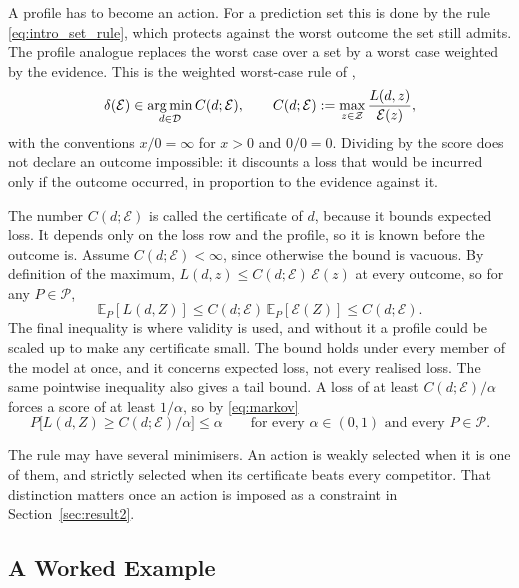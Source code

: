 A profile has to become an action. For a prediction set this is done by the
rule \eqref{eq:intro_set_rule}, which protects against the worst outcome the
set still admits. The profile analogue replaces the worst case over a set by a
worst case weighted by the evidence. This is the weighted worst-case rule of
\citet{KoningvanMeer2025},
\begin{equation}
  \delta(\mathcal E)\in\operatorname*{arg\,min}_{d\in\mathcal D}C(d;\mathcal E),
  \qquad
  C(d;\mathcal E):=\max_{z\in\mathcal Z}
  \frac{L(d,z)}{\mathcal E(z)},
  \label{eq:wl_decision}
\end{equation}
with the conventions $x/0=\infty$ for $x>0$ and $0/0=0$. Dividing by the score
does not declare an outcome impossible: it discounts a loss that would be
incurred only if the outcome occurred, in proportion to the evidence against
it.

The number $C(d;\mathcal E)$ is called the certificate of $d$, because it
bounds expected loss. It depends only on the loss row and the profile, so it
is known before the outcome is. Assume $C(d;\mathcal E)<\infty$, since otherwise the
bound is vacuous. By definition of the maximum,
$L(d,z)\leq C(d;\mathcal E)\,\mathcal E(z)$ at every outcome, so for any
$P\in\mathcal P$,
\begin{equation}
  \mathbb E_{P}[L(d,Z)]
  \leq C(d;\mathcal E)\,\mathbb E_{P}[\mathcal E(Z)]
  \leq C(d;\mathcal E).
  \label{eq:cert_bound}
\end{equation}
The final inequality is where validity is used, and without it a profile could
be scaled up to make any certificate small. The bound holds under every
member of the model at once, and it concerns expected loss, not every realised
loss. The same pointwise inequality also gives a tail bound. A loss of at
least $C(d;\mathcal E)/\alpha$ forces a score of at least $1/\alpha$, so by
\eqref{eq:markov}
\[
  P\bigl[L(d,Z)\geq C(d;\mathcal E)/\alpha\bigr]\leq\alpha
  \qquad\text{for every }\alpha\in(0,1)\text{ and every }P\in\mathcal P.
\]

The rule may have several minimisers. An action is weakly selected when
it is one of them, and strictly selected when its certificate beats every
competitor. That distinction matters once an action is imposed as a constraint
in Section~\ref{sec:result2}.

\subsection{A Worked Example}\label{sec:setup}

